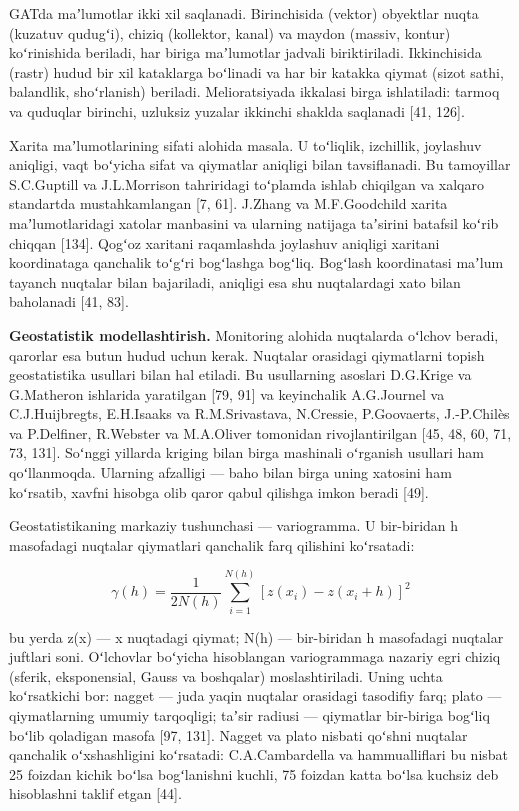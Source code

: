 \documentclass[14pt,a4paper,oneside]{extreport}
\begin{document}
GATda maʼlumotlar ikki xil saqlanadi. Birinchisida (vektor) obyektlar
nuqta (kuzatuv qudugʻi), chiziq (kollektor, kanal) va maydon (massiv,
kontur) koʻrinishida beriladi, har biriga maʼlumotlar jadvali
biriktiriladi. Ikkinchisida (rastr) hudud bir xil kataklarga boʻlinadi
va har bir katakka qiymat (sizot sathi, balandlik, shoʻrlanish)
beriladi. Melioratsiyada ikkalasi birga ishlatiladi: tarmoq va quduqlar
birinchi, uzluksiz yuzalar ikkinchi shaklda saqlanadi {[}41, 126{]}.

Xarita maʼlumotlarining sifati alohida masala. U toʻliqlik, izchillik,
joylashuv aniqligi, vaqt boʻyicha sifat va qiymatlar aniqligi bilan
tavsiflanadi. Bu tamoyillar S.C.Guptill va J.L.Morrison tahriridagi
toʻplamda ishlab chiqilgan va xalqaro standartda mustahkamlangan {[}7,
61{]}. J.Zhang va M.F.Goodchild xarita maʼlumotlaridagi xatolar
manbasini va ularning natijaga taʼsirini batafsil koʻrib chiqqan
{[}134{]}. Qogʻoz xaritani raqamlashda joylashuv aniqligi xaritani
koordinataga qanchalik toʻgʻri bogʻlashga bogʻliq. Bogʻlash koordinatasi
maʼlum tayanch nuqtalar bilan bajariladi, aniqligi esa shu nuqtalardagi
xato bilan baholanadi {[}41, 83{]}.

\textbf{Geostatistik modellashtirish.} Monitoring alohida nuqtalarda
oʻlchov beradi, qarorlar esa butun hudud uchun kerak. Nuqtalar orasidagi
qiymatlarni topish geostatistika usullari bilan hal etiladi. Bu
usullarning asoslari D.G.Krige va G.Matheron ishlarida yaratilgan {[}79,
91{]} va keyinchalik A.G.Journel va C.J.Huijbregts, E.H.Isaaks va
R.M.Srivastava, N.Cressie, P.Goovaerts, J.-P.Chilès va P.Delfiner,
R.Webster va M.A.Oliver tomonidan rivojlantirilgan {[}45, 48, 60, 71,
73, 131{]}. Soʻnggi yillarda kriging bilan birga mashinali oʻrganish
usullari ham qoʻllanmoqda. Ularning afzalligi --- baho bilan birga uning
xatosini ham koʻrsatib, xavfni hisobga olib qaror qabul qilishga imkon
beradi {[}49{]}.

Geostatistikaning markaziy tushunchasi --- variogramma. U bir-biridan h
masofadagi nuqtalar qiymatlari qanchalik farq qilishini koʻrsatadi:

\begin{equation}\tag{1.3}
\gamma(h) = \frac{1}{2N(h)} \sum_{i=1}^{N(h)} \left[ z(x_i) - z(x_i + h) \right]^2
\end{equation}

bu yerda z(x) --- x nuqtadagi qiymat; N(h) --- bir-biridan h masofadagi
nuqtalar juftlari soni. Oʻlchovlar boʻyicha hisoblangan variogrammaga
nazariy egri chiziq (sferik, eksponensial, Gauss va boshqalar)
moslashtiriladi. Uning uchta koʻrsatkichi bor: nagget --- juda yaqin
nuqtalar orasidagi tasodifiy farq; plato --- qiymatlarning umumiy
tarqoqligi; taʼsir radiusi --- qiymatlar bir-biriga bogʻliq boʻlib
qoladigan masofa {[}97, 131{]}. Nagget va plato nisbati qoʻshni nuqtalar
qanchalik oʻxshashligini koʻrsatadi: C.A.Cambardella va hammualliflari
bu nisbat 25 foizdan kichik boʻlsa bogʻlanishni kuchli, 75 foizdan katta
boʻlsa kuchsiz deb hisoblashni taklif etgan {[}44{]}.
\end{document}
